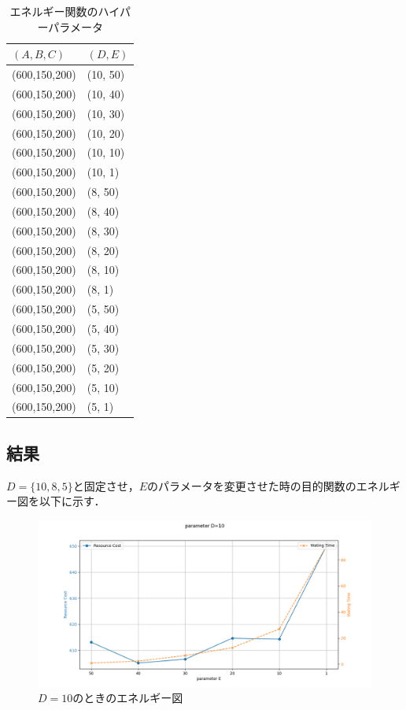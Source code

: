 \documentclass[conference]{IEEEtran}
\begin{document}
\begin{table}[h]
\centering
\caption{エネルギー関数のハイパーパラメータ}
\begin{tabularx}{0.25\textwidth}{>{\centering\arraybackslash}p{2.0cm}|X}
\hline
$(A,B,C)$ & $(D,E)$ \\ \hline 
      (600,150,200) & (10, 50)  \\ \hline 
      (600,150,200) & (10, 40)  \\ \hline 
      (600,150,200) & (10, 30)  \\ \hline 
      (600,150,200) & (10, 20)  \\ \hline 
      (600,150,200) & (10, 10)  \\ \hline 
      (600,150,200) & (10, 1)  \\ \hline 
      (600,150,200) & (8, 50)  \\ \hline 
      (600,150,200) & (8, 40)  \\ \hline 
      (600,150,200) & (8, 30)  \\ \hline 
      (600,150,200) & (8, 20)  \\ \hline 
      (600,150,200) & (8, 10)  \\ \hline 
      (600,150,200) & (8, 1)  \\ \hline 
      (600,150,200) & (5, 50)  \\ \hline 
      (600,150,200) & (5, 40)  \\ \hline 
      (600,150,200) & (5, 30)  \\ \hline 
      (600,150,200) & (5, 20)  \\ \hline 
      (600,150,200) & (5, 10)  \\ \hline 
      (600,150,200) & (5, 1)  \\ \hline 
      \hline
\end{tabularx}
\label{parameter}
\end{table}

\subsection{結果}
$D=\{10,8,5\}$と固定させ，$E$のパラメータを変更させた時の目的関数のエネルギー図を以下に示す．
\begin{figure}[htbp]
\centerline{\includegraphics[scale=0.3]{./fig/D_10.pdf}}
\caption{$D=10$のときのエネルギー図}
\label{fig3}
\end{figure}
\end{document}
